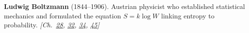 \textbf{Ludwig Boltzmann} (1844–1906). Austrian physicist who established statistical mechanics and formulated the equation $S=k \log W$ linking entropy to probability. \emph{[Ch.~\hyperref[ch:negativetemperature]{28}, \hyperref[ch:atomic]{32}, \hyperref[ch:boltzmannbrain]{34}, \hyperref[ch:maxwelldemon]{45}]}

